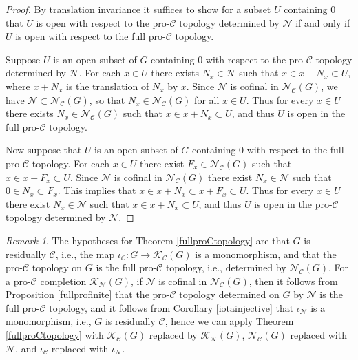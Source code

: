 \documentclass{amsart}
\theoremstyle{plain}
\theoremstyle{definition}
\theoremstyle{remark}
\newtheorem{remark}{Remark}
\begin{document}
\begin{proof} By translation invariance it suffices to show for a subset $U$ containing $0$ that $U$ is open with respect to the pro-${\mathcal C}$ topology determined by ${\mathcal N}$ if and only if $U$ is open with respect to the full pro-${\mathcal C}$ topology.

Suppose $U$ is an open subset of $G$ containing $0$ with respect to the pro-${\mathcal C}$ topology determined by ${\mathcal N}$. For each $x\in U$ there exists $N_x\in {\mathcal N}$ such that $x\in x+N_x\subset U$, where $x+N_x$ is the translation of $N_x$ by $x$. Since ${\mathcal N}$ is cofinal in ${\mathcal N}_{\mathcal C}(G)$, we have ${\mathcal N}\subset {\mathcal N}_{\mathcal C}(G)$, so that $N_x\in {\mathcal N}_{\mathcal C}(G)$ for all $x\in U$. Thus for every $x\in U$ there exists $N_x\in {\mathcal N}_{\mathcal C}(G)$ such that $x\in x+N_x\subset U$, and thus $U$ is open in the full pro-${\mathcal C}$ topology.

Now suppose that $U$ is an open subset of $G$ containing $0$ with respect to the full pro-${\mathcal C}$ topology. For each $x\in U$ there exist $F_x\in {\mathcal N}_{\mathcal C}(G)$ such that $x\in x+F_x\subset U$. Since ${\mathcal N}$ is cofinal in ${\mathcal N}_{\mathcal C}(G)$ there exist $N_x\in {\mathcal N}$ such that $0\in N_x\subset F_x$. This implies that $x\in x+N_x\subset x+F_x\subset U$. Thus for every $x\in U$ there exist $N_x\in {\mathcal N}$ such that $x\in x+N_x\subset U$, and thus $U$ is open in the pro-${\mathcal C}$ topology determined by ${\mathcal N}$.
\end{proof}

\begin{remark}\label{applyfullproC} The hypotheses for Theorem \ref{fullproCtopology} are that $G$ is residually ${\mathcal C}$, i.e., the map $\iota_{\mathcal C}:G\to {\mathcal K}_{\mathcal C}(G)$ is a monomorphism, and that the pro-${\mathcal C}$ topology on $G$ is the full pro-${\mathcal C}$ topology, i.e., determined by ${\mathcal N}_{\mathcal C}(G)$. For a pro-${\mathcal C}$ completion ${\mathcal K}_{\mathcal N}(G)$, if ${\mathcal N}$ is cofinal in ${\mathcal N}_{\mathcal C}(G)$, then it follows from Proposition \ref{fullprofinite} that the pro-${\mathcal C}$ topology determined on $G$ by ${\mathcal N}$ is the full pro-${\mathcal C}$ topology, and it follows from Corollary \ref{iotainjective} that $\iota_{\mathcal N}$ is a monomorphism, i.e., $G$ is residually ${\mathcal C}$, hence we can apply Theorem \ref{fullproCtopology} with ${\mathcal K}_{\mathcal C}(G)$ replaced by ${\mathcal K}_{\mathcal N}(G)$, ${\mathcal N}_{\mathcal C}(G)$ replaced with ${\mathcal N}$, and $\iota_{\mathcal C}$ replaced with $\iota_{\mathcal N}$.
\end{remark}
\end{document}
